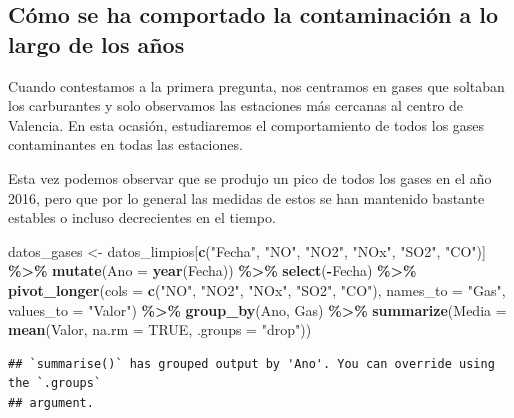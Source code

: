 \documentclass[notspecified,article,submit,moreauthors,pdftex]{Definitions/mdpi}
\newenvironment{Shaded}{\begin{snugshade}}{\end{snugshade}}
\newcommand{\AttributeTok}[1]{\textcolor[rgb]{0.13,0.29,0.53}{#1}}
\newcommand{\ConstantTok}[1]{\textcolor[rgb]{0.56,0.35,0.01}{#1}}
\newcommand{\FunctionTok}[1]{\textcolor[rgb]{0.13,0.29,0.53}{\textbf{#1}}}
\newcommand{\NormalTok}[1]{#1}
\newcommand{\OtherTok}[1]{\textcolor[rgb]{0.56,0.35,0.01}{#1}}
\newcommand{\SpecialCharTok}[1]{\textcolor[rgb]{0.81,0.36,0.00}{\textbf{#1}}}
\newcommand{\StringTok}[1]{\textcolor[rgb]{0.31,0.60,0.02}{#1}}
\begin{document}
\hypertarget{cuxf3mo-se-ha-comportado-la-contaminaciuxf3n-a-lo-largo-de-los-auxf1os}{%
\subsection{Cómo se ha comportado la contaminación a lo largo de los
años}\label{cuxf3mo-se-ha-comportado-la-contaminaciuxf3n-a-lo-largo-de-los-auxf1os}}

Cuando contestamos a la primera pregunta, nos centramos en gases que
soltaban los carburantes y solo observamos las estaciones más cercanas
al centro de Valencia. En esta ocasión, estudiaremos el comportamiento
de todos los gases contaminantes en todas las estaciones.

Esta vez podemos observar que se produjo un pico de todos los gases en
el año 2016, pero que por lo general las medidas de estos se han
mantenido bastante estables o incluso decrecientes en el tiempo.

\begin{Shaded}
\begin{Highlighting}[]
\NormalTok{datos\_gases }\OtherTok{\textless{}{-}}\NormalTok{ datos\_limpios[}\FunctionTok{c}\NormalTok{(}\StringTok{"Fecha"}\NormalTok{, }\StringTok{"NO"}\NormalTok{, }\StringTok{"NO2"}\NormalTok{, }\StringTok{"NOx"}\NormalTok{, }\StringTok{"SO2"}\NormalTok{, }\StringTok{"CO"}\NormalTok{)] }\SpecialCharTok{\%\textgreater{}\%}
  \FunctionTok{mutate}\NormalTok{(}\AttributeTok{Ano =} \FunctionTok{year}\NormalTok{(Fecha)) }\SpecialCharTok{\%\textgreater{}\%}
  \FunctionTok{select}\NormalTok{(}\SpecialCharTok{{-}}\NormalTok{Fecha) }\SpecialCharTok{\%\textgreater{}\%}
  \FunctionTok{pivot\_longer}\NormalTok{(}\AttributeTok{cols =} \FunctionTok{c}\NormalTok{(}\StringTok{"NO"}\NormalTok{, }\StringTok{"NO2"}\NormalTok{, }\StringTok{"NOx"}\NormalTok{, }\StringTok{"SO2"}\NormalTok{, }\StringTok{"CO"}\NormalTok{), }\AttributeTok{names\_to =} \StringTok{"Gas"}\NormalTok{, }\AttributeTok{values\_to =} \StringTok{"Valor"}\NormalTok{) }\SpecialCharTok{\%\textgreater{}\%}
  \FunctionTok{group\_by}\NormalTok{(Ano, Gas) }\SpecialCharTok{\%\textgreater{}\%}
  \FunctionTok{summarize}\NormalTok{(}\AttributeTok{Media =} \FunctionTok{mean}\NormalTok{(Valor, }\AttributeTok{na.rm =} \ConstantTok{TRUE}\NormalTok{, }\AttributeTok{.groups =} \StringTok{"drop"}\NormalTok{))}
\end{Highlighting}
\end{Shaded}

\begin{verbatim}
## `summarise()` has grouped output by 'Ano'. You can override using the `.groups`
## argument.
\end{verbatim}
\end{document}
